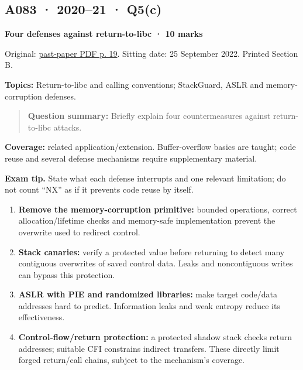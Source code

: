 \documentclass[11pt,a4paper]{article}
\begin{document}
\clearpage
\subsection{A083 · 2020–21 · Q5(c)}\label{a083}

\textbf{Four defenses against return-to-libc · 10 marks}


Original: \href{../../CSE405-Security_Merged.pdf\#page=19}{past-paper PDF p. 19}. Sitting date: 25 September 2022. Printed Section B.


\textbf{Topics:} Return-to-libc and calling conventions; StackGuard,\allowbreak{} ASLR and memory-corruption defenses.



\begin{quote}\small

\textbf{Question summary:} Briefly explain four countermeasures against return-to-libc attacks.



\end{quote}

\textbf{Coverage:} related application/\allowbreak{}extension. Buffer-overflow basics are taught; code reuse and several defense mechanisms require supplementary material.



{\color{ForestGreen}\textbf{Exam tip.} State what each defense interrupts and one relevant limitation; do not count “NX” as if it prevents code reuse by itself.}



\begin{enumerate}

\item \textbf{Remove the memory-corruption primitive:} bounded operations,\allowbreak{} correct allocation/\allowbreak{}lifetime checks and memory-safe implementation prevent the overwrite used to redirect control.

\item \textbf{Stack canaries:} verify a protected value before returning to detect many contiguous overwrites of saved control data. Leaks and noncontiguous writes can bypass this protection.

\item \textbf{ASLR with PIE and randomized libraries:} make target code/\allowbreak{}data addresses hard to predict. Information leaks and weak entropy reduce its effectiveness.

\item \textbf{Control-flow/\allowbreak{}return protection:} a protected shadow stack checks return addresses; suitable CFI constrains indirect transfers. These directly limit forged return/\allowbreak{}call chains,\allowbreak{} subject to the mechanism's coverage.

\end{enumerate}
\end{document}
